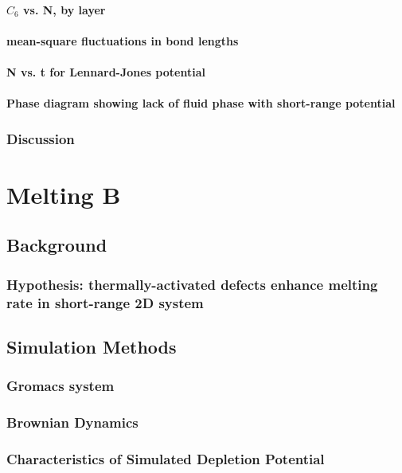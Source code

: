 \documentclass{umthesis}
\begin{document}
\subsubsection{$C_6$ vs. N, by layer}
\label{sec-1.3.6.3}
\subsubsection{mean-square fluctuations in bond lengths}
\label{sec-1.3.6.4}
\subsubsection{N vs. t for Lennard-Jones potential}
\label{sec-1.3.6.5}
\subsubsection{Phase diagram showing lack of fluid phase with short-range potential}
\label{sec-1.3.6.6}
\subsection{Discussion}
\label{sec-1.3.7}
\chapter{Melting B}
\label{sec-2}
\section{Background}
\label{sec-2.1}
\subsection{Hypothesis: thermally-activated defects enhance melting rate in short-range 2D system}
\label{sec-2.1.1}
\section{Simulation Methods}
\label{sec-2.2}
\subsection{Gromacs system}
\label{sec-2.2.1}
\subsection{Brownian Dynamics}
\label{sec-2.2.2}
\subsection{Characteristics of Simulated Depletion Potential}
\label{sec-2.2.3}
\end{document}
